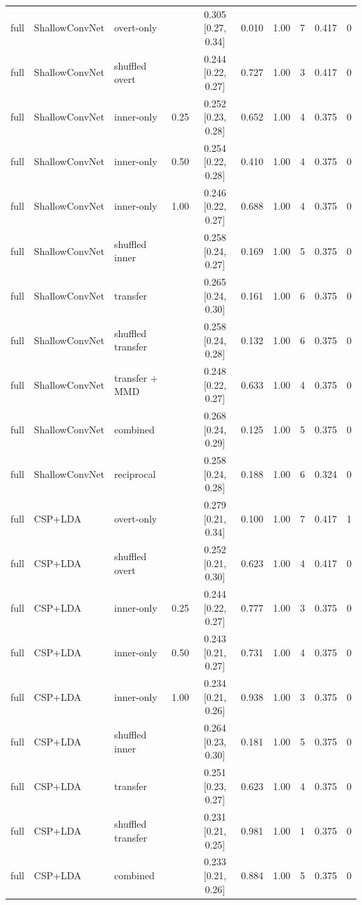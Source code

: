 \begin{longtable}{llllcccccc}
full & ShallowConvNet & overt-only &  & 0.305 [0.27, 0.34] & 0.010 & 1.00 & 7 & 0.417 & 0 \\
full & ShallowConvNet & shuffled overt &  & 0.244 [0.22, 0.27] & 0.727 & 1.00 & 3 & 0.417 & 0 \\
full & ShallowConvNet & inner-only & 0.25 & 0.252 [0.23, 0.28] & 0.652 & 1.00 & 4 & 0.375 & 0 \\
full & ShallowConvNet & inner-only & 0.50 & 0.254 [0.22, 0.28] & 0.410 & 1.00 & 4 & 0.375 & 0 \\
full & ShallowConvNet & inner-only & 1.00 & 0.246 [0.22, 0.27] & 0.688 & 1.00 & 4 & 0.375 & 0 \\
full & ShallowConvNet & shuffled inner &  & 0.258 [0.24, 0.27] & 0.169 & 1.00 & 5 & 0.375 & 0 \\
full & ShallowConvNet & transfer &  & 0.265 [0.24, 0.30] & 0.161 & 1.00 & 6 & 0.375 & 0 \\
full & ShallowConvNet & shuffled transfer &  & 0.258 [0.24, 0.28] & 0.132 & 1.00 & 6 & 0.375 & 0 \\
full & ShallowConvNet & transfer + MMD &  & 0.248 [0.22, 0.27] & 0.633 & 1.00 & 4 & 0.375 & 0 \\
full & ShallowConvNet & combined &  & 0.268 [0.24, 0.29] & 0.125 & 1.00 & 5 & 0.375 & 0 \\
full & ShallowConvNet & reciprocal &  & 0.258 [0.24, 0.28] & 0.188 & 1.00 & 6 & 0.324 & 0 \\
full & CSP+LDA & overt-only &  & 0.279 [0.21, 0.34] & 0.100 & 1.00 & 7 & 0.417 & 1 \\
full & CSP+LDA & shuffled overt &  & 0.252 [0.21, 0.30] & 0.623 & 1.00 & 4 & 0.417 & 0 \\
full & CSP+LDA & inner-only & 0.25 & 0.244 [0.22, 0.27] & 0.777 & 1.00 & 3 & 0.375 & 0 \\
full & CSP+LDA & inner-only & 0.50 & 0.243 [0.21, 0.27] & 0.731 & 1.00 & 4 & 0.375 & 0 \\
full & CSP+LDA & inner-only & 1.00 & 0.234 [0.21, 0.26] & 0.938 & 1.00 & 3 & 0.375 & 0 \\
full & CSP+LDA & shuffled inner &  & 0.264 [0.23, 0.30] & 0.181 & 1.00 & 5 & 0.375 & 0 \\
full & CSP+LDA & transfer &  & 0.251 [0.23, 0.27] & 0.623 & 1.00 & 4 & 0.375 & 0 \\
full & CSP+LDA & shuffled transfer &  & 0.231 [0.21, 0.25] & 0.981 & 1.00 & 1 & 0.375 & 0 \\
full & CSP+LDA & combined &  & 0.233 [0.21, 0.26] & 0.884 & 1.00 & 5 & 0.375 & 0 \\

\end{longtable}
